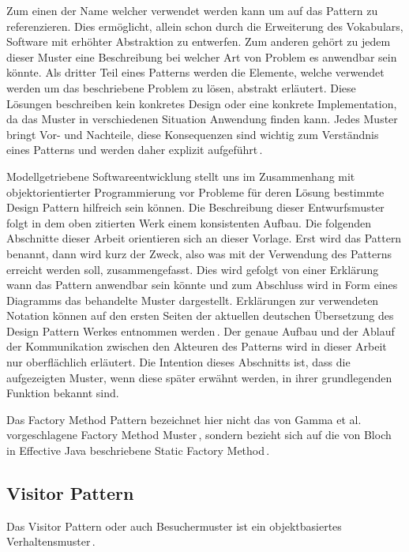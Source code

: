 \documentclass[12pt,oneside,a4paper,parskip]{scrbook}
\begin{document}
Zum einen der Name welcher verwendet werden kann um auf das Pattern zu referenzieren. Dies ermöglicht, allein schon durch die Erweiterung des Vokabulars, Software mit erhöhter Abstraktion zu entwerfen. Zum anderen gehört zu jedem dieser Muster eine Beschreibung bei welcher Art von Problem es anwendbar sein könnte. Als dritter Teil eines Patterns werden die Elemente, welche verwendet werden um das beschriebene Problem zu lösen, abstrakt erläutert. Diese Lösungen beschreiben kein konkretes Design oder eine konkrete Implementation, da das Muster in verschiedenen Situation Anwendung finden kann. Jedes Muster bringt Vor- und Nachteile, diese Konsequenzen sind wichtig zum Verständnis eines Patterns und werden daher explizit aufgeführt\,\cite[S.30 f.]{gamma2015}.

Modellgetriebene Softwareentwicklung stellt uns im Zusammenhang mit objektorientierter Programmierung vor Probleme für deren Lösung bestimmte Design Pattern hilfreich sein können. Die Beschreibung dieser Entwurfsmuster folgt in dem oben zitierten Werk einem konsistenten Aufbau. Die folgenden Abschnitte dieser Arbeit orientieren sich an dieser Vorlage. Erst wird das Pattern benannt, dann wird kurz der Zweck, also was mit der Verwendung des Patterns erreicht werden soll, zusammengefasst. Dies wird gefolgt von einer Erklärung wann das Pattern anwendbar sein könnte und zum Abschluss wird in Form eines Diagramms das behandelte Muster dargestellt. Erklärungen zur verwendeten Notation können auf den ersten Seiten der aktuellen deutschen Übersetzung des Design Pattern Werkes entnommen werden\,\cite[S. 8]{gamma2015}. Der genaue Aufbau und der Ablauf der Kommunikation zwischen den Akteuren des Patterns wird in dieser Arbeit nur oberflächlich erläutert. Die Intention dieses Abschnitts ist, dass die aufgezeigten Muster, wenn diese später erwähnt werden, in ihrer grundlegenden Funktion bekannt sind.

Das Factory Method Pattern bezeichnet hier nicht das von Gamma et al. vorgeschlagene Factory Method Muster\,\cite[S. 173ff.]{gamma2015}, sondern bezieht sich auf die von Bloch in Effective Java beschriebene Static Factory Method\,\cite[S. 5ff.]{bloch2017}.

\subsection{Visitor Pattern}

Das Visitor Pattern oder auch Besuchermuster ist ein objektbasiertes Verhaltensmuster\,\cite[S. 480]{gamma2015}.
\end{document}
